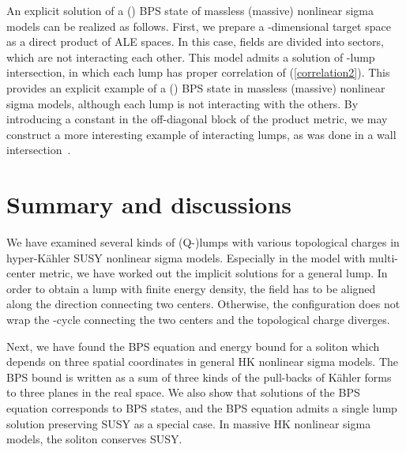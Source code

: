 \documentclass[a4paper,12pt]{article}
\providecommand{\kahler}{K\"{a}hler }
\begin{document}
An explicit solution of 
a \coordHE{} (\coordHE{}) BPS state 
of massless (massive) nonlinear sigma models 
can be realized as follows. 
First, we prepare a \coordHE{}-dimensional target space as  
a direct product of \coordHE{} ALE spaces. 
In this case, fields are divided into \coordHE{} sectors, 
which are not interacting  each other. 
This model admits a solution of \coordHE{}-lump intersection, 
in which each lump has proper 
correlation of (\ref{correlation2}). 
This provides an explicit example of a \coordHE{} (\coordHE{}) BPS state 
in massless (massive) nonlinear sigma models, 
although each lump is not interacting with the others.
By introducing a constant in 
the off-diagonal block of the product metric, 
we may construct 
a more interesting example of 
interacting lumps, 
as was done in a wall intersection~\cite{Townsend1}.

\vspace{5mm}

\section{Summary and discussions}
\label{sc:Summary}
We have examined several kinds of (Q-)lumps with various topological 
charges in \coordHE{} hyper-\kahler SUSY nonlinear sigma models. 
Especially 
in the model 
with multi-center metric, we have worked 
out the implicit solutions for a general 
lump. 
In order to obtain a lump with finite energy density, 
the field \coordHE{} has to be aligned along the direction 
connecting two centers. 
Otherwise, the configuration does not wrap the \coordHE{}-cycle connecting 
the two centers and the topological charge diverges. 

Next, we have found the BPS equation and energy bound for a soliton 
which depends on three spatial coordinates 
 in general HK nonlinear sigma models. 
The BPS bound is written as a sum of three kinds of the pull-backs 
of \kahler forms to three planes in the real space. 
We also show that solutions of the BPS equation corresponds to 
\coordHE{} BPS states, and the BPS equation admits a single lump solution 
preserving \coordHE{} SUSY as a special case. 
In massive HK nonlinear sigma models, the soliton conserves \coordHE{} SUSY. 
\end{document}
